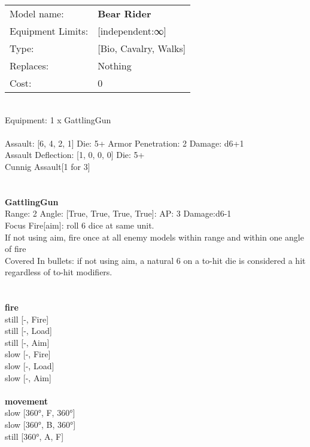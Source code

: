 \noindent
\begin{tabular}{ll}
Model name: &{\bf Bear Rider } \\
Equipment Limits: &[independent:∞] \\
Type: &[Bio, Cavalry, Walks] \\
Replaces: &Nothing \\
Cost: & 0\\
\end{tabular}
\ \\
Equipment: 1 x GattlingGun \\
\ \\
Assault: [6, 4, 2, 1] Die: 5+ Armor Penetration: 2 Damage: d6+1 \\
Assault Deflection: [1, 0, 0, 0] Die: 5+\\
\indent Cunnig Assault[1 for 3]\\ 
 
\ \\

\ \\
{\bf GattlingGun } \\



Range: 2  Angle: [True, True, True, True]: AP: 3 Damage:d6-1 \\
Focus Fire[aim]: roll 6 dice at same unit.\\ 
If not using aim, fire once at all enemy models within range and within one angle of fire\\ 
Covered In bullets: if not using aim, a natural 6 on a to-hit die is considered a hit regardless of to-hit modifiers.\\ 




 
\ \\



\ \\ {\bf fire } \\
still [-, Fire] \\
still [-, Load] \\
still [-, Aim] \\
slow [-, Fire] \\
slow [-, Load] \\
slow [-, Aim] \\
\ \\ {\bf movement } \\
slow [360°, F, 360°] \\
slow [360°, B, 360°] \\
still [360°, A, F] \\


